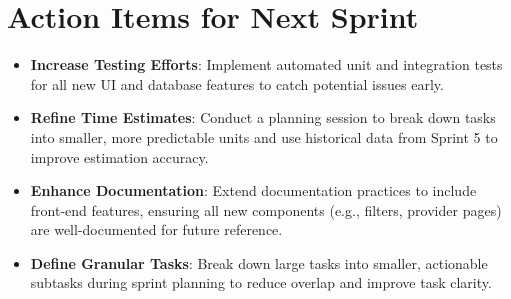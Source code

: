 \documentclass[a4paper,12pt]{article}
\begin{document}
\section*{Action Items for Next Sprint}
\begin{itemize}
    \item \textbf{Increase Testing Efforts}: Implement automated unit and integration tests for all new UI and database features to catch potential issues early.
    \item \textbf{Refine Time Estimates}: Conduct a planning session to break down tasks into smaller, more predictable units and use historical data from Sprint 5 to improve estimation accuracy.
    \item \textbf{Enhance Documentation}: Extend documentation practices to include front-end features, ensuring all new components (e.g., filters, provider pages) are well-documented for future reference.
    \item \textbf{Define Granular Tasks}: Break down large tasks into smaller, actionable subtasks during sprint planning to reduce overlap and improve task clarity.
\end{itemize}
\end{document}
